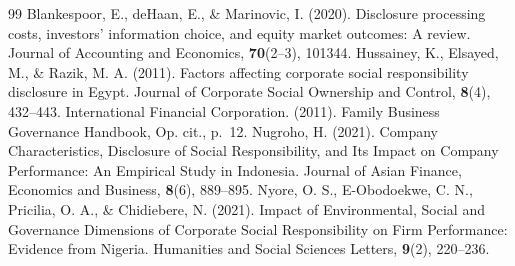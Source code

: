 \documentclass{NSP1}
\begin{document}
\begin{thebibliography}{99}
 Blankespoor, E., deHaan, E., \& Marinovic, I. (2020). Disclosure processing costs, investors' information choice, and equity market outcomes: A review. Journal of Accounting and Economics, \textbf{70}(2--3), 101344.
 Hussainey, K., Elsayed, M., \& Razik, M. A. (2011). Factors affecting corporate social responsibility disclosure in Egypt. Journal of Corporate Social Ownership and Control, \textbf{8}(4), 432--443.
 International Financial Corporation. (2011). Family Business Governance Handbook, Op. cit., p.~12.
 Nugroho, H. (2021). Company Characteristics, Disclosure of Social Responsibility, and Its Impact on Company Performance: An Empirical Study in Indonesia. Journal of Asian Finance, Economics and Business, \textbf{8}(6), 889--895.
 Nyore, O. S., E-Obodoekwe, C. N., Pricilia, O. A., \& Chidiebere, N. (2021). Impact of Environmental, Social and Governance Dimensions of Corporate Social Responsibility on Firm Performance: Evidence from Nigeria. Humanities and Social Sciences Letters, \textbf{9}(2), 220--236.
\end{thebibliography}
\end{document}
